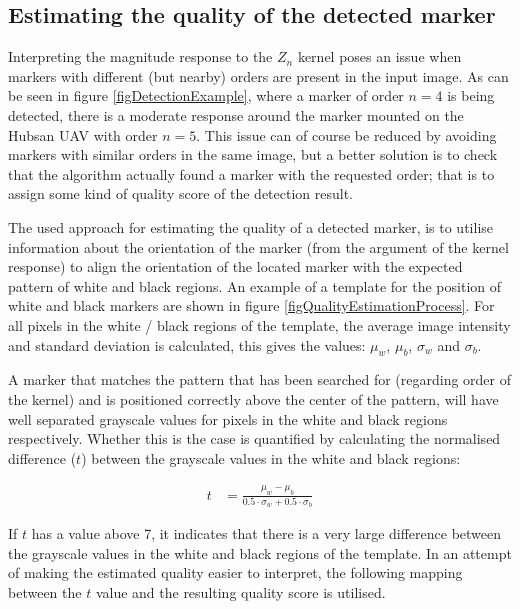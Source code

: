 \documentclass{article}
\begin{document}
\subsection{Estimating the quality of the detected marker}
Interpreting the magnitude response to the $Z_n$ kernel poses an issue
when markers with different (but nearby) orders are present in the input image.
As can be seen in figure \ref{figDetectionExample}, where a marker of order $n = 4$
is being detected, there is a moderate response around the marker mounted on the Hubsan UAV with order $n = 5$.
This issue can of course be reduced by avoiding markers with similar orders in the same image, but
a better solution is to check that the algorithm actually found a marker with the requested order; that
is to assign some kind of quality score of the detection result.

The used approach for estimating the quality of a detected marker, is to utilise
information about the orientation of the marker (from the argument of the kernel response)
to align the orientation of the located marker with the expected pattern of white and black regions.
An example of a template for the position of white and black markers are shown in
figure \ref{figQualityEstimationProcess}.
For all pixels in the white / black regions of the template, the average image intensity and
standard deviation is calculated, this gives the values: $\mu_w$, $\mu_b$, $\sigma_w$ and $\sigma_b$.

A marker that matches the pattern that has been searched for (regarding order of the kernel)
and is positioned correctly above the center of the pattern, will have well separated grayscale values for pixels in the
white and black regions respectively.
Whether this is the case is quantified by calculating the normalised difference ($t$) between
the grayscale values in the white and black regions:

\begin{align}
t &= \frac{\mu_w - \mu_b}{0.5 \cdot \sigma_w + 0.5 \cdot \sigma_b}
\end{align}

If $t$ has a value above 7, it indicates that there is a very large difference between the grayscale
values in the white and black regions of the template.
In an attempt of making the estimated quality easier to interpret, the following
mapping between the $t$ value and the resulting quality score is utilised.
\end{document}

